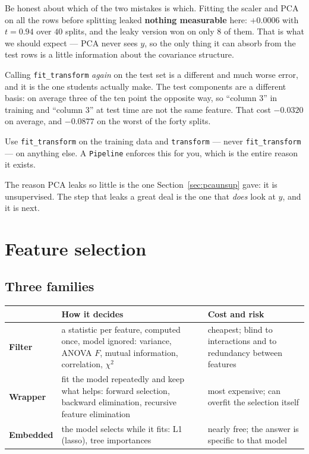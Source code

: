 \documentclass[11pt]{article}
\begin{document}
Be honest about which of the two mistakes is which. Fitting the scaler and PCA
on all the rows before splitting leaked \textbf{nothing measurable} here:
$+0.0006$ with $t = 0.94$ over $40$ splits, and the leaky version won on only
$8$ of them. That is what we should expect --- PCA never sees $y$, so the only
thing it can absorb from the test rows is a little information about the
covariance structure.

Calling \texttt{fit\_transform} \emph{again} on the test set is a different and
much worse error, and it is the one students actually make. The test
components are a different basis: on average three of the ten point the
opposite way, so ``column 3'' in training and ``column 3'' at test time are
not the same feature. That cost $-0.0320$ on average, and $-0.0877$ on the
worst of the forty splits.

\begin{caution}
Use \texttt{fit\_transform} on the training data and \texttt{transform}
--- never \texttt{fit\_transform} --- on anything else. A \texttt{Pipeline}
enforces this for you, which is the entire reason it exists.
\end{caution}

The reason PCA leaks so little is the one Section~\ref{sec:pcaunsup} gave: it
is unsupervised. The step that leaks a great deal is the one that \emph{does}
look at $y$, and it is next.

\notesources{\AMLUnitIVSources}

\section{Feature selection}
\label{sec:select}

\subsection{Three families}

\begin{center}
\begin{tabular}{@{}lp{4.6cm}p{4.8cm}@{}}
\toprule
& \textbf{How it decides} & \textbf{Cost and risk}\\
\midrule
\textbf{Filter} & a statistic per feature, computed once, model ignored:
  variance, ANOVA $F$, mutual information, correlation, $\chi^2$ &
  cheapest; blind to interactions and to redundancy between features\\[5pt]
\textbf{Wrapper} & fit the model repeatedly and keep what helps: forward
  selection, backward elimination, recursive feature elimination &
  most expensive; can overfit the selection itself\\[5pt]
\textbf{Embedded} & the model selects while it fits: L1 (lasso), tree
  importances & nearly free; the answer is specific to that model\\
\bottomrule
\end{tabular}
\end{center}
\end{document}
